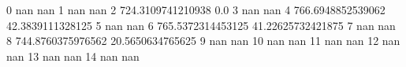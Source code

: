 0 nan nan
1 nan nan
2 724.3109741210938 0.0
3 nan nan
4 766.6948852539062 42.3839111328125
5 nan nan
6 765.5372314453125 41.22625732421875
7 nan nan
8 744.8760375976562 20.5650634765625
9 nan nan
10 nan nan
11 nan nan
12 nan nan
13 nan nan
14 nan nan
